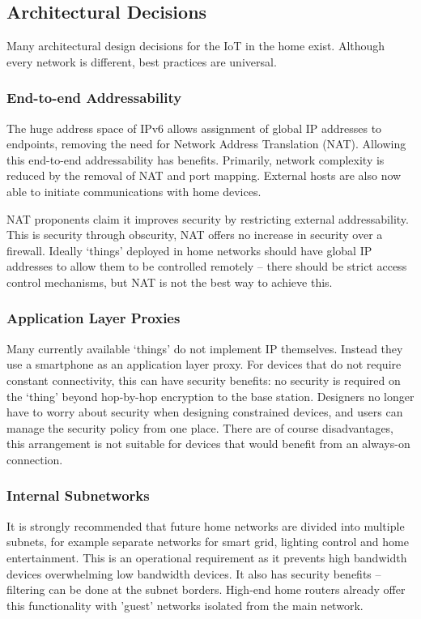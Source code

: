 \documentclass[10pt,journal,compsoc]{IEEEtran}
\begin{document}
\subsection{Architectural Decisions}
Many architectural design decisions for the IoT in the home exist. Although
every network is different, best practices are universal. 

\subsubsection{End-to-end Addressability}
The huge address space of IPv6 allows assignment of global IP addresses to
endpoints, removing the need for Network Address Translation (NAT). Allowing
this end-to-end addressability has benefits. Primarily, network complexity is
reduced by the removal of NAT and port mapping. External hosts are also now
able to initiate communications with home devices.

NAT proponents claim it improves security by restricting external
addressability. This is security through obscurity, NAT offers no increase in
security over a firewall. Ideally `things' deployed in home networks should
have global IP addresses to allow them to be controlled remotely -- there
should be strict access control mechanisms, but NAT is not the best way to
achieve this. 

\subsubsection{Application Layer Proxies}
Many currently available `things' do not implement IP themselves. Instead they
use a smartphone as an application layer proxy. For devices that do not require
constant connectivity, this can have security benefits: no security is required
on the `thing' beyond hop-by-hop encryption to the base station.  Designers no
longer have to worry about security when designing constrained devices, and
users can manage the security policy from one place. There are of course
disadvantages, this arrangement is not suitable for devices that would benefit
from an always-on connection. 

\subsubsection{Internal Subnetworks}
It is strongly recommended that future home networks are divided into multiple
subnets, for example separate networks for smart grid, lighting control and
home entertainment. This is an operational requirement as it prevents high
bandwidth devices overwhelming low bandwidth devices. It also has security
benefits -- filtering can be done at the subnet borders. High-end home routers
already offer this functionality with 'guest' networks isolated from the main
network.
\end{document}
